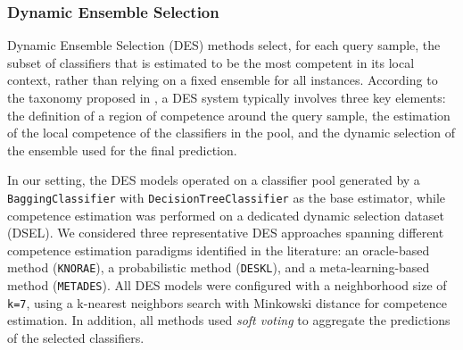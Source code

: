 \documentclass[conference]{IEEEtran}
\begin{document}
\subsubsection{Dynamic Ensemble Selection}

Dynamic Ensemble Selection (DES) methods select, for each query sample, the subset of classifiers that is estimated to be the most competent in its local context, rather than relying on a fixed ensemble for all instances. According to the taxonomy proposed in \cite{CRUZ2018195}, a DES system typically involves three key elements: the definition of a region of competence around the query sample, the estimation of the local competence of the classifiers in the pool, and the dynamic selection of the ensemble used for the final prediction. 

In our setting, the DES models operated on a classifier pool generated by a \texttt{BaggingClassifier} with \texttt{DecisionTreeClassifier} as the base estimator, while competence estimation was performed on a dedicated dynamic selection dataset (DSEL). We considered three representative DES approaches spanning different competence estimation paradigms identified in the literature: an oracle-based method (\texttt{KNORAE}), a probabilistic method (\texttt{DESKL}), and a meta-learning-based method (\texttt{METADES}). All DES models were configured with a neighborhood size of \texttt{k=7}, using a k-nearest neighbors search with Minkowski distance for competence estimation. In addition, all methods used \textit{soft voting} to aggregate the predictions of the selected classifiers.
\end{document}

